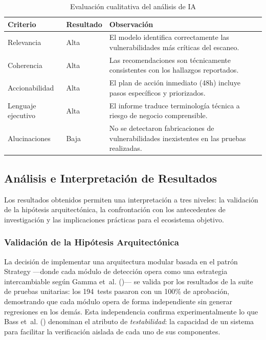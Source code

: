 \documentclass[12pt, a4paper]{article}
\begin{document}
\begin{table}[H]
    \centering
    \caption{Evaluación cualitativa del análisis de IA}
    \label{tab:ia-eval}
    \begin{tabular}{p{4cm} p{2cm} p{6.5cm}}
        \toprule
        \textbf{Criterio} & \textbf{Resultado} & \textbf{Observación} \\
        \midrule
        Relevancia &
            Alta &
            El modelo identifica correctamente las vulnerabilidades más
            críticas del escaneo. \\
        Coherencia &
            Alta &
            Las recomendaciones son técnicamente consistentes con los
            hallazgos reportados. \\
        Accionabilidad &
            Alta &
            El plan de acción inmediato (48h) incluye pasos específicos
            y priorizados. \\
        Lenguaje ejecutivo &
            Alta &
            El informe traduce terminología técnica a riesgo de negocio
            comprensible. \\
        Alucinaciones &
            Baja &
            No se detectaron fabricaciones de vulnerabilidades
            inexistentes en las pruebas realizadas. \\
        \bottomrule
    \end{tabular}
\end{table}

\subsection{Análisis e Interpretación de Resultados}

Los resultados obtenidos permiten una interpretación a tres niveles:
la validación de la hipótesis arquitectónica, la confrontación con los
antecedentes de investigación y las implicaciones prácticas para el
ecosistema objetivo.

\subsubsection{Validación de la Hipótesis Arquitectónica}

La decisión de implementar una arquitectura modular basada en el patrón
Strategy ---donde cada módulo de detección opera como una estrategia
intercambiable según Gamma et~al. (\citeyear*{gamma1995})--- se valida
por los resultados de la suite de pruebas unitarias: los 194~tests
pasaron con un 100\% de aprobación, demostrando que cada módulo opera
de forma independiente sin generar regresiones en los demás. Esta
independencia confirma experimentalmente lo que Bass et~al.
(\citeyear*{bass2012}) denominan el atributo de \textit{testabilidad}:
la capacidad de un sistema para facilitar la verificación aislada de
cada uno de sus componentes.
\end{document}
